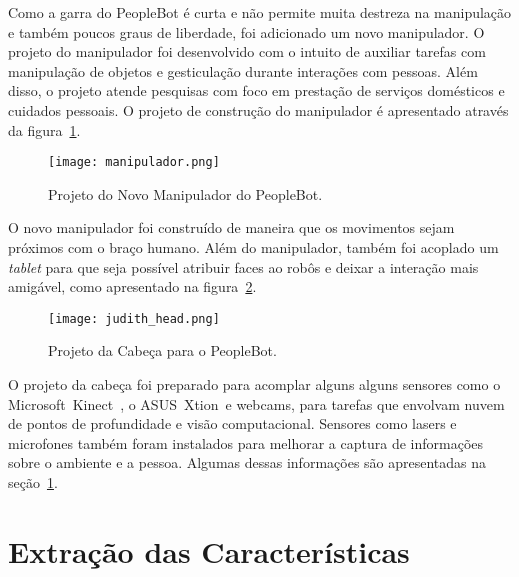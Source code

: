 Como a garra do PeopleBot é curta e não permite muita destreza na manipulação e também poucos graus de liberdade, foi adicionado um novo manipulador. O projeto do manipulador foi desenvolvido com o intuito de auxiliar tarefas com manipulação de objetos e gesticulação durante interações com pessoas. Além disso, o projeto atende pesquisas com foco em prestação de serviços domésticos e cuidados pessoais. O projeto de construção do manipulador é apresentado através da figura~\ref{fig:manipulador}.

\begin{figure}[ht!]
	\centering
	\begin{minipage}{0.6\textwidth}
		\caption{Projeto do Novo Manipulador do PeopleBot.}
		\texttt{[image: manipulador.png]}
		\label{fig:manipulador}
	\end{minipage}
\end{figure}

O novo manipulador foi construído de maneira que os movimentos sejam próximos com o braço humano. Além do manipulador, também foi acoplado um \emph{tablet} para que seja possível atribuir faces ao robôs e deixar a interação mais amigável, como apresentado na figura~\ref{fig:judithhead}.

\begin{figure}[ht!]
	\centering
	\begin{minipage}{0.4\textwidth}
		\caption{Projeto da Cabeça para o PeopleBot.}
		\texttt{[image: judith\_head.png]}
		\label{fig:judithhead}
	\end{minipage}
\end{figure}

O projeto da cabeça foi preparado para acomplar alguns alguns sensores como o Microsoft\textregistered\ Kinect\textregistered\ , o ASUS\textregistered\ Xtion\textregistered\ e webcams, para tarefas que envolvam nuvem de pontos de profundidade e visão computacional. Sensores como lasers e microfones também foram instalados para melhorar a captura de informações sobre o ambiente e a pessoa. Algumas dessas informações são apresentadas na seção~\ref{sec:extracaocaracteristicas}.

\section{Extração das Características}
\label{sec:extracaocaracteristicas}

